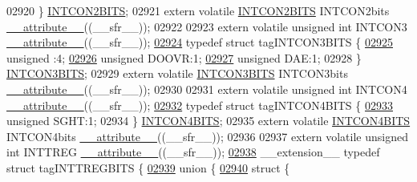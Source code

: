 \begin{DoxyCode}
02920 \} \hyperlink{a00014_dc/d1c/a00504}{INTCON2BITS};
02921 \textcolor{keyword}{extern} \textcolor{keyword}{volatile} \hyperlink{a00014_dc/d1c/a00504}{INTCON2BITS} INTCON2bits \hyperlink{a00015_a493c46f03454991ccc5aa7a6e1dfb2a7}{\_\_attribute\_\_}((\_\_sfr\_\_));
02922 
02923 \textcolor{keyword}{extern} \textcolor{keyword}{volatile} \textcolor{keywordtype}{unsigned} \textcolor{keywordtype}{int}  INTCON3 \hyperlink{a00015_a493c46f03454991ccc5aa7a6e1dfb2a7}{\_\_attribute\_\_}((\_\_sfr\_\_));
\hypertarget{a00015_source_l02924}{}\hyperlink{a00014}{02924} \textcolor{keyword}{typedef} \textcolor{keyword}{struct }tagINTCON3BITS \{
\hypertarget{a00015_source_l02925}{}\hyperlink{a00014_adf71f3d8410c1f1dbbc96680a92c49af}{02925}   \textcolor{keywordtype}{unsigned} :4;
\hypertarget{a00015_source_l02926}{}\hyperlink{a00014_ac08ea92557a6100bdfa6e0c8e1842273}{02926}   \textcolor{keywordtype}{unsigned} DOOVR:1;
\hypertarget{a00015_source_l02927}{}\hyperlink{a00014_aec1162551ca60d4d19c47e42894a1c1b}{02927}   \textcolor{keywordtype}{unsigned} DAE:1;
02928 \} \hyperlink{a00014_d7/d37/a00505}{INTCON3BITS};
02929 \textcolor{keyword}{extern} \textcolor{keyword}{volatile} \hyperlink{a00014_d7/d37/a00505}{INTCON3BITS} INTCON3bits \hyperlink{a00015_a493c46f03454991ccc5aa7a6e1dfb2a7}{\_\_attribute\_\_}((\_\_sfr\_\_));
02930 
02931 \textcolor{keyword}{extern} \textcolor{keyword}{volatile} \textcolor{keywordtype}{unsigned} \textcolor{keywordtype}{int}  INTCON4 \hyperlink{a00015_a493c46f03454991ccc5aa7a6e1dfb2a7}{\_\_attribute\_\_}((\_\_sfr\_\_));
\hypertarget{a00015_source_l02932}{}\hyperlink{a00014}{02932} \textcolor{keyword}{typedef} \textcolor{keyword}{struct }tagINTCON4BITS \{
\hypertarget{a00015_source_l02933}{}\hyperlink{a00014_af7d1f4e1cc3f0d22f2c69971173c3c0f}{02933}   \textcolor{keywordtype}{unsigned} SGHT:1;
02934 \} \hyperlink{a00014_d4/d1f/a00506}{INTCON4BITS};
02935 \textcolor{keyword}{extern} \textcolor{keyword}{volatile} \hyperlink{a00014_d4/d1f/a00506}{INTCON4BITS} INTCON4bits \hyperlink{a00015_a493c46f03454991ccc5aa7a6e1dfb2a7}{\_\_attribute\_\_}((\_\_sfr\_\_));
02936 
02937 \textcolor{keyword}{extern} \textcolor{keyword}{volatile} \textcolor{keywordtype}{unsigned} \textcolor{keywordtype}{int}  INTTREG \hyperlink{a00015_a493c46f03454991ccc5aa7a6e1dfb2a7}{\_\_attribute\_\_}((\_\_sfr\_\_));
\hypertarget{a00015_source_l02938}{}\hyperlink{a00014}{02938} \_\_extension\_\_ \textcolor{keyword}{typedef} \textcolor{keyword}{struct }tagINTTREGBITS \{
\hypertarget{a00015_source_l02939}{}\hyperlink{a00015}{02939}   \textcolor{keyword}{union }\{
\hypertarget{a00015_source_l02940}{}\hyperlink{a00015}{02940}     \textcolor{keyword}{struct }\{

\end{DoxyCode}
